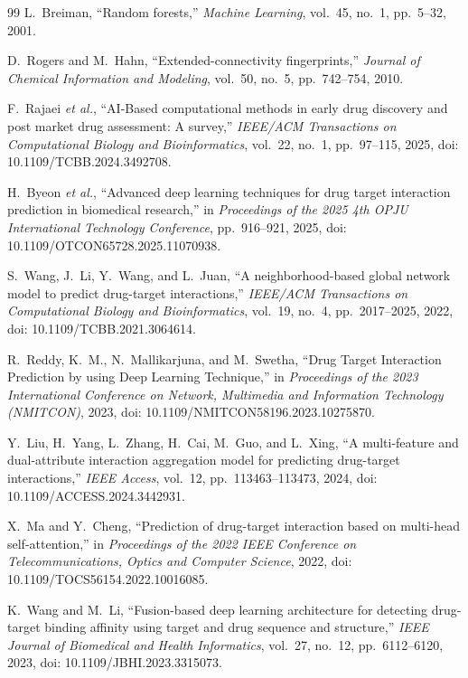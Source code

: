 \documentclass[10pt,conference]{IEEEtran}
\begin{document}
\begin{thebibliography}{99}
 L.~Breiman, ``Random forests,'' \textit{Machine Learning}, vol.~45, no.~1, pp.~5--32, 2001.

 D.~Rogers and M.~Hahn, ``Extended-connectivity fingerprints,'' \textit{Journal of Chemical Information and Modeling}, vol.~50, no.~5, pp.~742--754, 2010.

 F.~Rajaei \textit{et al.}, ``AI-Based computational methods in early drug discovery and post market drug assessment: A survey,'' \textit{IEEE/ACM Transactions on Computational Biology and Bioinformatics}, vol.~22, no.~1, pp.~97--115, 2025, doi: 10.1109/TCBB.2024.3492708.

 H.~Byeon \textit{et al.}, ``Advanced deep learning techniques for drug target interaction prediction in biomedical research,'' in \textit{Proceedings of the 2025 4th OPJU International Technology Conference}, pp.~916--921, 2025, doi: 10.1109/OTCON65728.2025.11070938.

 S.~Wang, J.~Li, Y.~Wang, and L.~Juan, ``A neighborhood-based global network model to predict drug-target interactions,'' \textit{IEEE/ACM Transactions on Computational Biology and Bioinformatics}, vol.~19, no.~4, pp.~2017--2025, 2022, doi: 10.1109/TCBB.2021.3064614.

 R.~Reddy, K.~M., N.~Mallikarjuna, and M.~Swetha, ``Drug Target Interaction Prediction by using Deep Learning Technique,'' in \textit{Proceedings of the 2023 International Conference on Network, Multimedia and Information Technology (NMITCON)}, 2023, doi: 10.1109/NMITCON58196.2023.10275870.

 Y.~Liu, H.~Yang, L.~Zhang, H.~Cai, M.~Guo, and L.~Xing, ``A multi-feature and dual-attribute interaction aggregation model for predicting drug-target interactions,'' \textit{IEEE Access}, vol.~12, pp.~113463--113473, 2024, doi: 10.1109/ACCESS.2024.3442931.

 X.~Ma and Y.~Cheng, ``Prediction of drug-target interaction based on multi-head self-attention,'' in \textit{Proceedings of the 2022 IEEE Conference on Telecommunications, Optics and Computer Science}, 2022, doi: 10.1109/TOCS56154.2022.10016085.

 K.~Wang and M.~Li, ``Fusion-based deep learning architecture for detecting drug-target binding affinity using target and drug sequence and structure,'' \textit{IEEE Journal of Biomedical and Health Informatics}, vol.~27, no.~12, pp.~6112--6120, 2023, doi: 10.1109/JBHI.2023.3315073.


\end{thebibliography}
\end{document}

